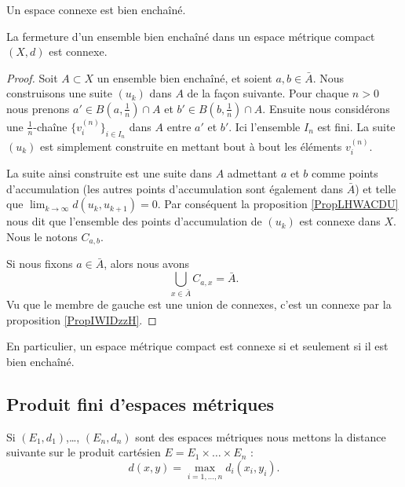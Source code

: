 \begin{proposition}
    Un espace connexe est bien enchaîné.
\end{proposition}

\begin{proposition}
    La fermeture d'un ensemble bien enchaîné dans un espace métrique compact \( (X,d)\) est connexe.
\end{proposition}

\begin{proof}
    Soit \( A\subset X\) un ensemble bien enchaîné, et soient \( a,b\in \bar A\). Nous construisons une suite \( (u_k)\) dans \( A\) de la façon suivante. Pour chaque \( n>0\) nous prenons \( a'\in B(a,\frac{1}{ n })\cap A\) et \( b'\in B(b,\frac{1}{ n })\cap A\). Ensuite nous considérons une \( \frac{1}{ n }\)-chaîne \( \{ v_i^{(n)} \}_{i\in I_n}\) dans \( A\) entre \( a'\) et \( b'\). Ici l'ensemble \( I_n\) est fini. La suite \( (u_k)\) est simplement construite en mettant bout à bout les éléments \( v_i^{(n)}\).
 
    La suite ainsi construite est une suite dans \( A\) admettant \( a\) et \( b\) comme points d'accumulation (les autres points d'accumulation sont également dans \( \bar A\)) et telle que \( \lim_{k\to \infty} d(u_k,u_{k+1})=0\). Par conséquent la proposition \ref{PropLHWACDU} nous dit que l'ensemble des points d'accumulation de \( (u_k)\) est connexe dans \( X\). Nous le notons \( C_{a,b}\).

    Si nous fixons \( a\in \bar A\), alors nous avons
    \begin{equation}
        \bigcup_{x\in \bar A}C_{a,x}=\bar A.
    \end{equation}
    Vu que le membre de gauche est une union de connexes, c'est un connexe par la proposition \ref{PropIWIDzzH}.
\end{proof}
En particulier, un espace métrique compact est connexe si et seulement si il est bien enchaîné.

\subsection{Produit fini d'espaces métriques}

\begin{definition}\label{DefZTHxrHA}
    Si \( (E_1,d_1)\),\ldots, \( (E_n,d_n)\) sont des espaces métriques nous mettons la distance suivante sur le produit cartésien \( E=E_1\times\ldots\times E_n\) :
    \begin{equation}
        d(x,y)=\max_{i=1,\ldots, n}d_i(x_i,y_i).
    \end{equation}
\end{definition}

